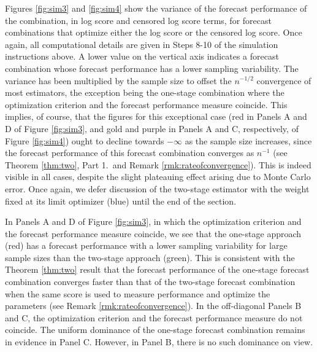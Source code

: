 \documentclass[12pt]{article}
\theoremstyle{definition}
\theoremstyle{remark}
\begin{document}
Figures \ref{fig:sim3} and \ref{fig:sim4} show the variance of the forecast performance of the combination, in log score and censored log score terms, for forecast combinations that optimize either the log score or the censored log score. Once again, all computational details are given in Steps 8-10 of the simulation instructions above. A lower value on the vertical axis indicates a forecast combination whose forecast performance has a lower sampling variability. The variance has been multiplied by the sample size to offset the $n^{-1/2}$ convergence of most estimators, the exception being the one-stage combination where the optimization criterion and the forecast performance measure coincide. This implies, of course, that the figures for this exceptional case (red in Panels A and D of Figure \ref{fig:sim3}, and gold and purple in Panels A and C, respectively, of Figure \ref{fig:sim4}) ought to decline towards $-\infty$ as the sample size increases, since the forecast performance of this forecast combination converges as $n^{-1}$ (see Theorem \ref{thm:two}, Part 1.\ and Remark \ref{rmk:rateofconvergence}). This is indeed visible in all cases, despite the slight plateauing effect arising due to Monte Carlo error. Once again, we defer discussion of the two-stage estimator with the weight fixed at its limit optimizer (blue) until the end of the section.

In Panels A and D of Figure \ref{fig:sim3}, in which the optimization criterion and the forecast performance measure coincide, we see that the one-stage approach (red) has a forecast performance with a lower sampling variability for large sample sizes than the two-stage approach (green). This is consistent with the Theorem \ref{thm:two} result that the forecast performance of the one-stage forecast combination converges faster than that of the two-stage forecast combination when the same score is used to measure performance and optimize the parameters (see Remark \ref{rmk:rateofconvergence}). In the off-diagonal Panels B and C, the optimization criterion and the forecast performance measure do not coincide. The uniform dominance of the one-stage forecast combination remains in evidence in Panel C. However, in Panel B, there is no such dominance on view.
\end{document}

